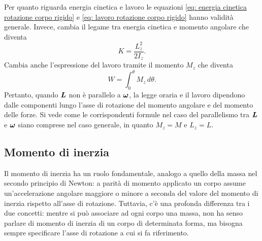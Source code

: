 Per quanto riguarda energia cinetica e lavoro le equazioni \eqref{eq: energia cinetica rotazione corpo rigido} e \eqref{eq: lavoro rotazione corpo rigido} hanno validità generale. Invece, cambia il legame tra energia cinetica e momento angolare che diventa
\begin{equation}
    K=\frac{L_z^2}{2I_z}.
\end{equation}
Cambia anche l'espressione del lavoro tramite il momento $M_z$ che diventa
\begin{equation}
    W=\int_0^\theta M_z\,d\theta.
\end{equation}
Pertanto, quando $\bm{L}$ non è parallelo a $\bm{\omega}$, la legge oraria e il lavoro dipendono dalle componenti lungo l'asse di rotazione del momento angolare e del momento delle forze. Si vede come le corrispondenti formule nel caso del parallelismo tra $\bm{L}$ e $\bm{\omega}$ siano comprese nel caso generale, in quanto $M_z=M$ e $L_z=L$. 

\subsection{Momento di inerzia}
Il momento di inerzia ha un ruolo fondamentale, analogo a quello della massa nel secondo principio di Newton: a parità di momento applicato un corpo assume un'accelerazione angolare maggiore o minore a seconda del valore del momento di inerzia rispetto all'asse di rotazione. Tuttavia, c'è una profonda differenza tra i due concetti: mentre si può associare ad ogni corpo una massa, non ha senso parlare di momento di inerzia di un corpo di determinata forma, ma bisogna sempre specificare l'asse di rotazione a cui si fa riferimento. 

